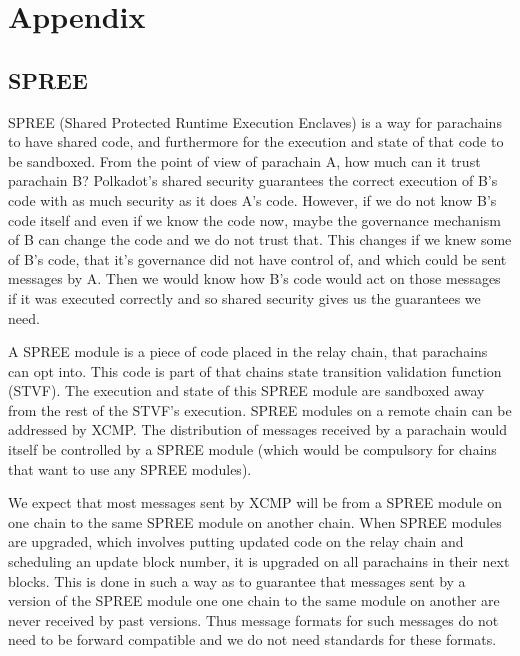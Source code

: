 \section{Appendix}

\subsection{SPREE} \label{sec:SPREE}

SPREE (Shared Protected Runtime Execution Enclaves) is a way for parachains to have shared code, and furthermore for the execution and state of that code to be sandboxed. From the point of view of parachain A, how much can it trust parachain B? Polkadot's shared security guarantees the correct execution of B's code with as much security as it does A's code. However, if we do not know B's code itself and even if we know the code now, maybe the governance mechanism of B can change the code and we do not trust that. This changes if we knew some of B's code, that it's governance did not have control of, and which could be sent messages by A. Then we would know how B's code would act on those messages if it was executed correctly and so shared security gives us the guarantees we need.

A SPREE module is a piece of code placed in the relay chain, that parachains can opt into. This code is part of that chains state transition validation function (STVF). The execution and state of this SPREE module are sandboxed away from the rest of the STVF's execution. SPREE modules on a remote chain can be addressed by XCMP. The distribution of messages received by a parachain would itself be controlled by a SPREE module (which would be compulsory for chains that want to use any SPREE modules).

We expect that most messages sent by XCMP will be from a SPREE module on one chain to the same SPREE module on another chain. When SPREE modules are upgraded, which involves putting updated code on the relay chain and scheduling an update block number, it is upgraded on all parachains in their next blocks. This is done in such a way as to guarantee that messages sent by a version of the SPREE module one one chain to the same module on another are never received by past versions. Thus message formats for such messages do not need to be forward compatible and we do not need standards for these formats.


